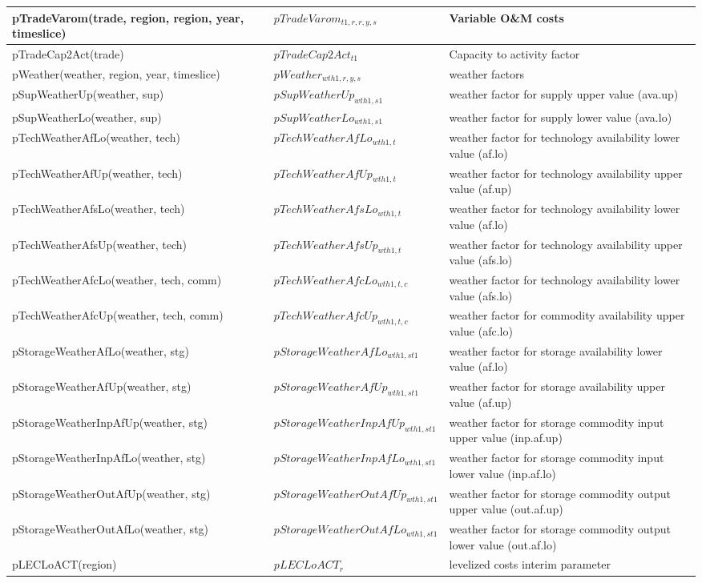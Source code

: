 \documentclass{article}
\begin{document}
\begin{longtable}{|p{10cm}|p{5cm}|p{9cm}|}
 \hline
pTradeVarom(trade, region, region, year, timeslice) & $pTradeVarom_{t1,r,r,y,s}$ & Variable O\&M costs \\
 \hline
pTradeCap2Act(trade) & $pTradeCap2Act_{t1}$ & Capacity to activity factor \\
 \hline
pWeather(weather, region, year, timeslice) & $pWeather_{wth1,r,y,s}$ & weather factors \\
 \hline
pSupWeatherUp(weather, sup) & $pSupWeatherUp_{wth1,s1}$ & weather factor for supply upper value (ava.up) \\
 \hline
pSupWeatherLo(weather, sup) & $pSupWeatherLo_{wth1,s1}$ & weather factor for supply lower value (ava.lo) \\
 \hline
pTechWeatherAfLo(weather, tech) & $pTechWeatherAfLo_{wth1,t}$ & weather factor for technology availability lower value (af.lo) \\
 \hline
pTechWeatherAfUp(weather, tech) & $pTechWeatherAfUp_{wth1,t}$ & weather factor for technology availability upper value (af.up) \\
 \hline
pTechWeatherAfsLo(weather, tech) & $pTechWeatherAfsLo_{wth1,t}$ & weather factor for technology availability lower value (af.lo) \\
 \hline
pTechWeatherAfsUp(weather, tech) & $pTechWeatherAfsUp_{wth1,t}$ & weather factor for technology availability upper value (afs.lo) \\
 \hline
pTechWeatherAfcLo(weather, tech, comm) & $pTechWeatherAfcLo_{wth1,t,c}$ & weather factor for technology availability lower value (afs.lo) \\
 \hline
pTechWeatherAfcUp(weather, tech, comm) & $pTechWeatherAfcUp_{wth1,t,c}$ & weather factor for commodity availability upper value (afc.lo) \\
 \hline
pStorageWeatherAfLo(weather, stg) & $pStorageWeatherAfLo_{wth1,st1}$ & weather factor for storage availability lower value (af.lo) \\
 \hline
pStorageWeatherAfUp(weather, stg) & $pStorageWeatherAfUp_{wth1,st1}$ & weather factor for storage availability upper value (af.up) \\
 \hline
pStorageWeatherInpAfUp(weather, stg) & $pStorageWeatherInpAfUp_{wth1,st1}$ & weather factor for storage commodity input upper value (inp.af.up) \\
 \hline
pStorageWeatherInpAfLo(weather, stg) & $pStorageWeatherInpAfLo_{wth1,st1}$ & weather factor for storage commodity input lower value (inp.af.lo) \\
 \hline
pStorageWeatherOutAfUp(weather, stg) & $pStorageWeatherOutAfUp_{wth1,st1}$ & weather factor for storage commodity output upper value (out.af.up) \\
 \hline
pStorageWeatherOutAfLo(weather, stg) & $pStorageWeatherOutAfLo_{wth1,st1}$ & weather factor for storage commodity output lower value (out.af.lo) \\
 \hline
pLECLoACT(region) & $pLECLoACT_{r}$ & levelized costs interim parameter \\
 \hline
\end{longtable}
\end{document}
